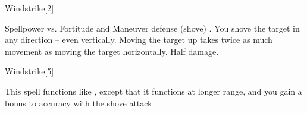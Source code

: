 \begin{spellsection}{Windstrike}[2]
    \begin{spellheader}
    \end{spellheader}
    \begin{spellcontent}
        \begin{spelltargetinginfo}
        \end{spelltargetinginfo}
        \begin{spelleffects}
            \begin{spellattack}{Spellpower vs. Fortitude and Maneuver defense (shove)}
                \spellsuccess[Fortitude] .
                \spellsuccess[Maneuver] You shove the target in any direction -- even vertically. Moving the target up takes twice as much movement as moving the target horizontally.
                \spellfailure[Fortitude] Half damage.
            \end{spellattack}
        \end{spelleffects}
    \end{spellcontent}
    \begin{spellfooter}
        \miscastrandom
    \end{spellfooter}
\end{spellsection}

\begin{spellsection}[Greater]{Windstrike}[5]
    \begin{spellheader}
    \end{spellheader}
    \begin{spellcontent}
        \begin{spelltargetinginfo}
        \end{spelltargetinginfo}
        \begin{spelleffects}
            \spellspecial This spell functions like , except that it functions at longer range, and you gain a  bonus to accuracy with the shove attack.
        \end{spelleffects}
    \end{spellcontent}
    \begin{spellfooter}
        \miscastrandom
    \end{spellfooter}
\end{spellsection}

